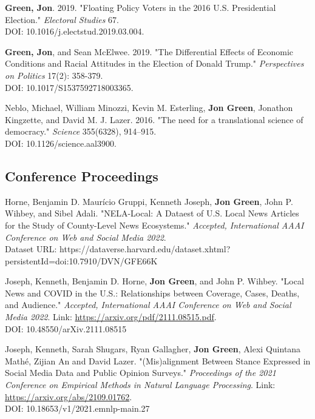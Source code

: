 \documentclass[letterpaper]{article}
\renewenvironment{itemize}{
  \begin{list}{}{
    \setlength{\leftmargin}{1.5em}
  }
}{
  \end{list}
}
\begin{document}
\begin{itemize}
\item \textbf{Green, Jon}. 2019. "Floating Policy Voters in the 2016 U.S. Presidential Election." \textit{Electoral Studies} 67. \\
DOI: 10.1016/j.electstud.2019.03.004.

\item \textbf{Green, Jon}, and Sean McElwee. 2019. "The Differential Effects of Economic Conditions and Racial Attitudes in the Election of Donald Trump." \textit{Perspectives on Politics} 17(2): 358-379. \\
DOI: 10.1017/S1537592718003365.

\item Neblo, Michael, William Minozzi, Kevin M. Esterling, \textbf{Jon Green}, Jonathon Kingzette, and David M. J. Lazer. 2016. "The need for a translational science of democracy." \textit{Science} 355(6328), 914--915.\\
DOI: 10.1126/science.aal3900.
\end{itemize}

\subsection*{Conference Proceedings}

\begin{itemize}
\item Horne, Benjamin D. Maur\'{i}cio Gruppi, Kenneth Joseph, \textbf{Jon Green}, John P. Wihbey, and Sibel Adali. "NELA-Local: A Dataest of U.S. Local News Articles for the Study of County-Level News Ecosystems." \textit{Accepted, International AAAI Conference on Web and Social Media 2022}.\\
Dataset URL: https://dataverse.harvard.edu/dataset.xhtml?persistentId=doi:10.7910/DVN/GFE66K

\item Joseph, Kenneth, Benjamin D. Horne, \textbf{Jon Green}, and John P. Wihbey. "Local News and COVID in the U.S.: Relationships between Coverage, Cases, Deaths, and Audience." \textit{Accepted, International AAAI Conference on Web and Social Media 2022}. Link: \url{https://arxiv.org/pdf/2111.08515.pdf}.\\
DOI: 10.48550/arXiv.2111.08515

\item Joseph, Kenneth, Sarah Shugars, Ryan Gallagher, \textbf{Jon Green}, Alexi Quintana Mathé, Zijian An and David Lazer. "(Mis)alignment Between Stance Expressed in Social Media Data and Public Opinion Surveys." \textit{Proceedings of the 2021 Conference on Empirical Methods in Natural Language Processing}. Link: \url{https://arxiv.org/abs/2109.01762}.\\
DOI: 10.18653/v1/2021.emnlp-main.27
\end{itemize}
\end{document}

